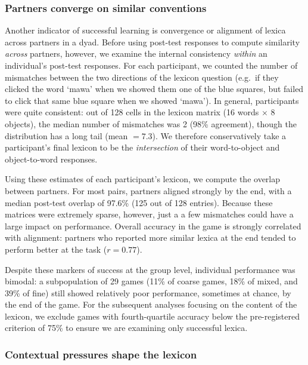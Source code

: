 \subsubsection{Partners converge on similar conventions}

Another indicator of successful learning is convergence or alignment of lexica across partners in a dyad. Before using post-test responses to compute similarity \emph{across} partners, however, we examine the internal consistency \emph{within} an individual's post-test responses. For each participant, we counted the number of mismatches between the two directions of the lexicon question (e.g.\ if they clicked the word `mawa' when we showed them one of the blue squares, but failed to click that same blue square when we showed `mawa'). In general, participants were quite consistent: out of 128 cells in the lexicon matrix (16 words $\times$ 8 objects), the median number of mismatches was 2 (98\% agreement), though the distribution has a long tail (mean $= 7.3$). We therefore conservatively take a participant's final lexicon to be the \emph{intersection} of their word-to-object and object-to-word responses.

Using these estimates of each participant's lexicon, we compute the overlap between partners. For most pairs, partners aligned strongly by the end, with a median post-test overlap of 97.6\% (125 out of 128 entries). Because these matrices were extremely sparse, however, just a a few mismatches could have a large impact on performance. Overall accuracy in the game is strongly correlated with alignment: partners who reported more similar lexica at the end tended to perform better at the task ($r = 0.77$).  

Despite these markers of success at the group level, individual performance was bimodal: a subpopulation of 29 games (11\% of coarse games, 18\% of mixed, and 39\% of fine) still showed relatively poor performance, sometimes at chance, by the end of the game. For the subsequent analyses focusing on the content of the lexicon, we exclude games with fourth-quartile accuracy below the pre-registered criterion of 75\% to ensure we are examining only successful lexica. %

\subsubsection{Contextual pressures shape the lexicon}

